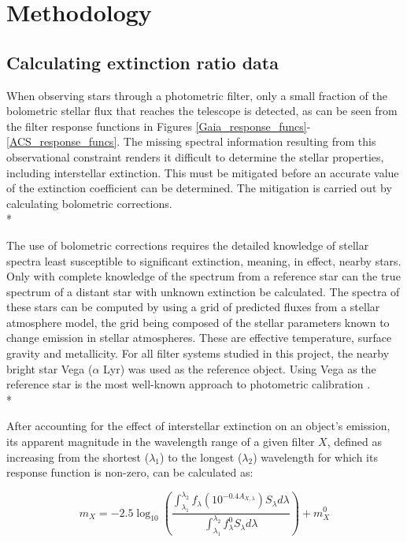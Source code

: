 \documentclass[12pt, a4paper]{report}
\begin{document}
\chapter{Methodology}
\section{Calculating extinction ratio data}
When observing stars through a photometric filter, only a small fraction of the bolometric stellar flux that reaches the telescope is detected, as can be seen from the filter response functions in Figures \ref{Gaia_response_funcs}-\ref{ACS_response_funcs}. The missing spectral information resulting from this observational constraint renders it difficult to determine the stellar properties, including interstellar extinction. This must be mitigated before an accurate value of the extinction coefficient can be determined. The mitigation is carried out by calculating bolometric corrections.\\*

The use of bolometric corrections requires the detailed knowledge of stellar spectra least susceptible to significant extinction, meaning, in effect, nearby stars. Only with complete knowledge of the spectrum from a reference star can the true spectrum of a distant star with unknown extinction be calculated. The spectra of these stars can be computed by using a grid of predicted fluxes from a stellar atmosphere model, the grid being composed of the stellar parameters known to change emission in stellar atmospheres. These are effective temperature, surface gravity and metallicity. For all filter systems studied in this project, the nearby bright star Vega ($\alpha$ Lyr) was used as the reference object. Using Vega as the reference star is the most well-known approach to photometric calibration \citep{2014MNRAS.444..392C}.\\*

After accounting for the effect of interstellar extinction on an object's emission, its apparent magnitude in the wavelength range of a given filter $X$, defined as increasing from the shortest ($\lambda_{1}$) to the longest ($\lambda_{2}$) wavelength for which its response function is non-zero, can be calculated as:

\begin{equation}
m_{X} = -2.5 \log_{10} \left(\frac{ \int_{\lambda_{1}}^{\lambda_{2}} f_{\lambda} \left( 10^{-0.4 A_{X,\lambda}} \right) S_{\lambda} d\lambda }{ \int_{\lambda_{1}}^{\lambda_{2}} f_{\lambda}^{0} S_{\lambda} d\lambda }\right) + m_{X}^{0}
\label{app_mag_def}
\end{equation}
\end{document}
